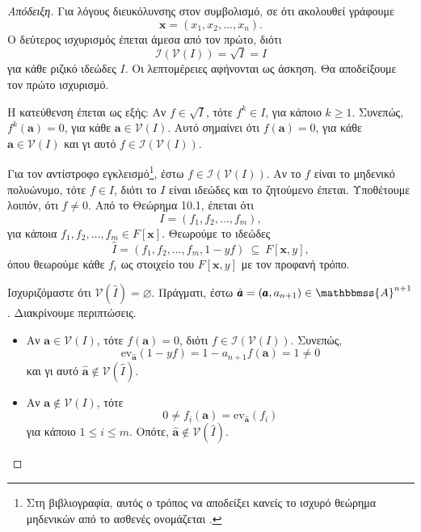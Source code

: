 \documentclass[12pt,a4paper,reqno]{amsart}
\theoremstyle{definition}
\theoremstyle{remark}
\numberwithin{theorem}{section}
\numberwithin{exercise}{section}
\numberwithin{equation}{section}
\renewcommand{\AA}{\mathbbmss{A}}
\newcommand{\iI}{\mathcal{I}}
\newcommand{\vV}{\mathcal{V}}
\newcommand{\bfa}{\pmb{a}}
\newcommand{\bfx}{\pmb{x}}
\renewcommand{\emptyset}{\varnothing}
\newcommand{\ev}{\mathrm{ev}}
\begin{document}
\begin{proof}[Απόδειξη]
  Για λόγους διευκόλυνσης στον συμβολισμό, σε ότι ακολουθεί γράφουμε 
  \[
  \bfx = (x_1, x_2, \dots, x_n).
  \]
  Ο δεύτερος ισχυρισμός έπεται άμεσα από τον πρώτο, διότι 
  \[
  \iI\left(
    \vV\left(
      I
    \right)
  \right) = \sqrt{I} = I
  \]
  για κάθε ριζικό ιδεώδες $I$. Οι λεπτομέρειες αφήνονται ως άσκηση. Θα αποδείξουμε τον πρώτο ισχυρισμό.

  Η κατεύθενση \textquote{$\supseteq$} έπεται ως εξής: Αν $f \in \sqrt{I}$, τότε $f^k \in I$, για κάποιο $k \ge 1$. Συνεπώς, $f^k(\bfa) = 0$, για κάθε $\bfa \in \vV(I)$. Αυτό σημαίνει ότι $f(\bfa) = 0$, για κάθε $\bfa \in \vV(I)$ και γι αυτό $f \in \iI\left(
    \vV\left(
      I
    \right)
  \right)$.

  Για τον αντίστροφο εγκλεισμό\footnote{Στη βιβλιογραφία, αυτός ο τρόπος να αποδείξει κανείς το ισχυρό θεώρημα μηδενικών από το ασθενές ονομάζεται .}, έστω $f \in \iI\left(
    \vV\left(
      I
    \right)
  \right)$. Αν το $f$ είναι το μηδενικό πολυώνυμο, τότε $f \in I$, διότι το $I$ είναι ιδεώδες και το ζητούμενο έπεται. Υποθέτουμε λοιπόν, ότι $f \neq 0$. Από το Θεώρημα 10.1, έπεται ότι 
  \[
  I = \left(
    f_1, f_2, \dots, f_m
  \right),
  \]
  για κάποια $f_1, f_2, \dots, f_m \in F[\bfx]$. Θεωρούμε το ιδεώδες 
  \[
  \hat{I} = \left(
    f_1, f_2, \dots, f_m , 1 -yf
  \right) \ \subseteq \ F[\bfx, y],
  \]
  όπου θεωρούμε κάθε $f_i$ ως στοιχείο του $F[\bfx,y]$ με τον προφανή τρόπο.

  Ισχυριζόμαστε ότι $\vV(\hat{I}) = \emptyset$. Πράγματι, έστω $\hat{\bfa} = \left(\bfa, a_{n+1}\right) \in \AA^{n+1}$. Διακρίνουμε περιπτώσεις.
  \begin{itemize}
    \item Αν $\bfa \in \vV(I)$, τότε $f(\bfa) = 0$, διότι $f \in \iI\left(
    \vV\left(
      I
    \right)
  \right)$. Συνεπώς, 
  \[
  \ev_{\hat{\bfa}}(1-yf) = 1 - a_{n+1}f(\bfa) = 1 \neq 0
  \]
  και γι αυτό $\hat{\bfa} \notin \vV(\hat{I})$.
    \item Αν $\bfa \notin \vV(I)$, τότε
    \[
    0 \neq f_i(\bfa) = \ev_{\hat{\bfa}}(f_i)
    \]
    για κάποιο $1 \le i \le m$. Οπότε, $\hat{\bfa} \notin \vV(\hat{I})$.
  \end{itemize}


\end{proof}
\end{document}
